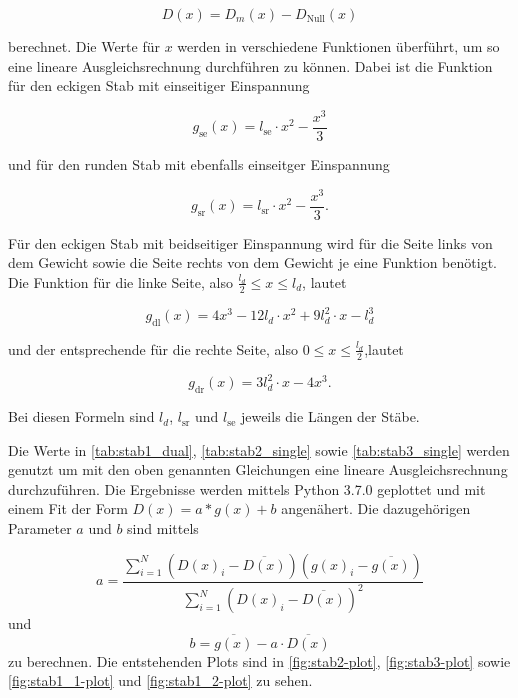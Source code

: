\begin{equation}
  D(x) = D_m(x) - D_\text{Null}(x)
\end{equation}

berechnet. Die Werte für $x$ werden in verschiedene Funktionen überführt, um so eine lineare Ausgleichsrechnung durchführen zu können.
Dabei ist die Funktion für den eckigen Stab mit einseitiger Einspannung

\begin{equation}
  g_\text{se}(x) = l_\text{se} \cdot x^2 - \frac{x^3}{3}
\end{equation}

und für den runden Stab mit ebenfalls einseitger Einspannung

\begin{equation}
  g_\text{sr}(x) = l_\text{sr} \cdot x^2 - \frac{x^3}{3} .
\end{equation}

Für den eckigen Stab mit beidseitiger Einspannung wird für die Seite links von dem Gewicht sowie die Seite rechts von dem Gewicht je eine Funktion benötigt.
Die Funktion für die linke Seite, also $\frac{l_d}{2} \leq x \leq l_d$, lautet

\begin{equation}
  g_\text{dl}(x) = 4x^3 - 12l_d \cdot x^2 + 9l_d^2 \cdot x - l_d^3
\end{equation}

und der entsprechende für die rechte Seite, also $0 \leq x \leq \frac{l_d}{2}$,lautet

\begin{equation}
  g_\text{dr}(x) = 3 l_d^2 \cdot x - 4x^3.
\end{equation}

Bei diesen Formeln sind $l_d$, $l_\text{sr}$ und $l_\text{se}$ jeweils die Längen der Stäbe.





Die Werte in \autoref{tab:stab1_dual}, \autoref{tab:stab2_single} sowie \autoref{tab:stab3_single} werden genutzt um mit den oben genannten Gleichungen eine lineare Ausgleichsrechnung durchzuführen.
Die Ergebnisse werden mittels Python 3.7.0 geplottet und mit einem Fit der Form $D(x) = a * g(x) + b$ angenähert.
Die dazugehörigen Parameter $a$ und $b$ sind mittels



\begin{equation}
\label{eqn:a}
  a = \frac {\sum_{i=1}^N (D(x)_i - \overline{D(x)}) (g(x)_i - \overline{g(x)})}{\sum_{i=1}^N (D(x)_i - \overline{D(x)})^2}
\end{equation}
und
\begin{equation}
\label{eqn:b}
  b = \overline{g(x)} - a \cdot \overline{D(x)}
\end{equation}
zu berechnen.
Die entstehenden Plots sind in \autoref{fig:stab2-plot}, \autoref{fig:stab3-plot} sowie \autoref{fig:stab1_1-plot} und \autoref{fig:stab1_2-plot} zu sehen.

